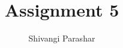 \documentclass[journal,12pt,twocolumn]{IEEEtran}
\begin{document}
\makeatletter
{}
\makeatother
\let\StandardTheFigure\thefigure
\let\vec\mathbf
\renewcommand{\thefigure}{\theproblem}
\def\putbox#1#2#3{\makebox[0in][l]{\makebox[#1][l]{}\raisebox{\baselineskip}[0in][0in]{\raisebox{#2}[0in][0in]{#3}}}}
     \def\rightbox#1{\makebox[0in][r]{#1}}
     \def\centbox#1{\makebox[0in]{#1}}
     \def\topbox#1{\raisebox{-\baselineskip}[0in][0in]{#1}}
     \def\midbox#1{\raisebox{-0.5\baselineskip}[0in][0in]{#1}}
\vspace{3cm}
\title{Assignment 5}
\author{Shivangi Parashar}
%
%
%
% 
%
\end{document}
